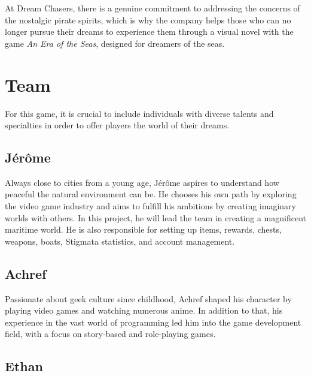 \documentclass{article}
\begin{document}
At Dream Chasers, there is a genuine commitment to addressing the concerns of the nostalgic pirate spirits, which is why the company helps those who can no longer pursue their dreams to experience them through a visual novel with the game \textit{An Era of the Seas}, designed for dreamers of the seas.















\newpage
\section{Team}\hfill

For this game, it is crucial to include individuals with diverse talents and specialties in order to offer players the world of their dreams.

\subsection{Jérôme}\hfill





Always close to cities from a young age, Jérôme aspires to understand how peaceful the natural environment can be. He chooses his own path by exploring the video game industry and aims to fulfill his ambitions by creating imaginary worlds with others. In this project, he will lead the team in creating a magnificent maritime world. He is also responsible for setting up items, rewards, chests, weapons, boats, Stigmata statistics, and account management.





\subsection{Achref}\hfill

Passionate about geek culture since childhood, Achref shaped his character by playing video games and watching numerous anime. In addition to that, his experience in the vast world of programming led him into the game development field, with a focus on story-based and role-playing games.





\subsection{Ethan}\hfill
\end{document}
